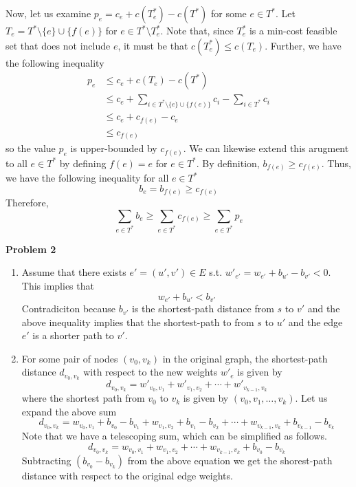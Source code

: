 \documentclass[a4paper]{/home/dawei/.dotfiles/templates/preamble}
\begin{document}
Now, let us examine $p_e = c_e + c(T^*_e) - c(T^*)$ for some $e \in T^*$. Let
$T_e = T^* \setminus \{e\} \cup \{f(e)\}$ for $e \in T^* \setminus T^*_e$. Note
that, since $T^*_e$ is a min-cost feasible set that does not include $e$, it
must be that $c(T^*_e) \le c(T_e)$. Further, we have the following inequality
\begin{align*}
  p_e &\le c_e + c(T_e) - c(T^*) \\
      &\le c_e + \sum_{i \in T^* \setminus \{e\} \cup \{f(e)\}} c_i - \sum_{i \in T^*} c_i\\
      &\le c_e + c_{f(e)} - c_e \\
      &\le c_{f(e)}
\end{align*}
so the value $p_e$ is upper-bounded by $c_{f(e)}$.
We can likewise extend this arugment to all $e \in T^*$ by defining $f(e) = e$
for $e \in T^*$. By definition, $b_{f(e)} \ge c_{f(e)}$. Thus, we have the
following inequality for all $e \in T^*$
\[
  b_e = b_{f(e)} \ge c_{f(e)}
\]
Therefore,
\[
  \sum_{e \in T^*} b_e \ge \sum_{e \in T^*} c_{f(e)} \ge \sum_{e \in T^*} p_e
\]

\noindent\textbf{Problem 2}
\begin{enumerate}[label = (\alph*)]
  \item Assume that there exists $e' = (u',v') \in E$ s.t. $w'_{e'} = w_{e'} + b_{u'} - b_{v'} < 0$.
    This implies that
    \[
      w_{e'} + b_{u'} < b_{v'}
    \]
    Contradiciton because $b_{v'}$ is the shortest-path distance from $s$ to $v'$ and
    the above inequality implies that the shortest-path to from $s$ to $u'$ and the edge $e'$ is
    a shorter path to $v'$.
  \item For some pair of nodes $(v_0,v_k)$ in the original graph, the shortest-path
    distance $d_{v_0,v_k}$ with respect to the new weights $w'_e$ is given by
    \[
      d_{v_0,v_k} = w'_{v_0, v_1} + w'_{v_1, v_2} + \cdots + w'_{v_{k-1},v_k}
    \]
    where the shortest path from $v_0$ to $v_k$ is given by $(v_0, v_1, \dots, v_k)$.
    Let us expand the above sum
    \[
      d_{v_0,v_k} = w_{v_0, v_1} + b_{v_0} - b_{v_1} + w_{v_1, v_2} + b_{v_1} - b_{v_2} + \cdots + w_{v_{k-1}, v_k} + b_{v_{k-1}} - b_{v_k} 
    \]
    Note that we have a telescoping sum, which can be simplified as follows.
    \[
      d_{v_0,v_k} = w_{v_0, v_1} + w_{v_1, v_2}  + \cdots + w_{v_{k-1}, v_k} + b_{v_0} - b_{v_k} 
    \]
    Subtracting $(b_{v_0} - b_{v_k})$ from the above equation we get the shorest-path
    distance with respect to the original edge weights.
\end{enumerate}
\end{document}

